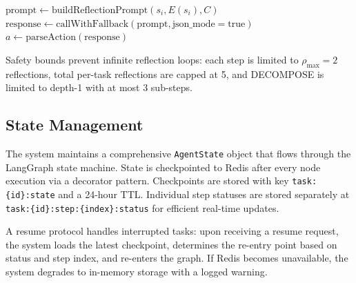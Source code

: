 \documentclass[conference]{IEEEtran}
\begin{document}
\begin{algorithm}[htbp]
    \caption{Self-Reflection Decision}
    \label{alg:reflection}
    $\textrm{prompt} \leftarrow \textrm{buildReflectionPrompt}(s_i, E(s_i), C)$\;
    $\textrm{response} \leftarrow \textrm{callWithFallback}(\textrm{prompt}, \textrm{json\_mode}{=}\textrm{true})$\;
    $a \leftarrow \textrm{parseAction}(\textrm{response})$\;
\end{algorithm}

Safety bounds prevent infinite reflection loops: each step is limited to $\rho_{\max} = 2$ reflections, total per-task reflections are capped at 5, and DECOMPOSE is limited to depth-1 with at most 3 sub-steps.

\subsection{State Management}
\label{sec:state}

The system maintains a comprehensive \texttt{AgentState} object that flows through the LangGraph state machine. State is checkpointed to Redis after every node execution via a decorator pattern. Checkpoints are stored with key \texttt{task:\{id\}:state} and a 24-hour TTL. Individual step statuses are stored separately at \texttt{task:\{id\}:step:\{index\}:status} for efficient real-time updates.

A resume protocol handles interrupted tasks: upon receiving a resume request, the system loads the latest checkpoint, determines the re-entry point based on status and step index, and re-enters the graph. If Redis becomes unavailable, the system degrades to in-memory storage with a logged warning.
\end{document}
